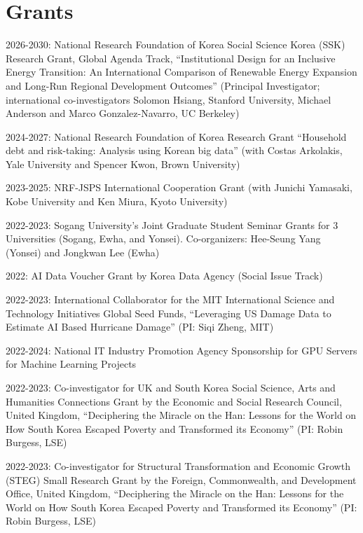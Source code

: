 \documentclass[a4paper,12pt]{article}
\renewenvironment{itemize}{
  \begin{list}{}{
    \setlength{\leftmargin}{1.5em}
  }
}{
  \end{list}
}
\begin{document}
\section*{Grants}

\begin{itemize}
    \item 2026-2030: National Research Foundation of Korea Social Science Korea (SSK) Research Grant, Global Agenda Track, ``Institutional Design for an Inclusive Energy Transition: An International Comparison of Renewable Energy Expansion and Long-Run Regional Development Outcomes'' (Principal Investigator; international co-investigators Solomon Hsiang, Stanford University, Michael Anderson and Marco Gonzalez-Navarro, UC Berkeley)
    \item 2024-2027: National Research Foundation of Korea Research Grant ``Household debt and risk-taking: Analysis using Korean big data'' (with Costas Arkolakis, Yale University and Spencer Kwon, Brown University)
    \item 2023-2025: NRF-JSPS International Cooperation Grant  (with Junichi Yamasaki, Kobe University and Ken Miura, Kyoto University)
    \item 2022-2023: Sogang University's Joint Graduate Student Seminar Grants for 3 Universities (Sogang, Ewha, and Yonsei). Co-organizers: Hee-Seung Yang (Yonsei) and Jongkwan Lee (Ewha)
    \item 2022: AI Data Voucher Grant by Korea Data Agency (Social Issue Track)
    \item 2022-2023: International Collaborator for the MIT International Science and Technology Initiatives Global Seed Funds, ``Leveraging US Damage Data to Estimate AI Based Hurricane Damage'' (PI: Siqi Zheng, MIT)
    \item 2022-2024: National IT Industry Promotion Agency Sponsorship for GPU Servers for Machine Learning Projects
    \item 2022-2023: Co-investigator for UK and South Korea Social Science, Arts and Humanities Connections Grant by the 	Economic and Social Research Council, United Kingdom, ``Deciphering the Miracle on the Han: Lessons for the World on How South Korea Escaped Poverty and Transformed its Economy'' (PI: Robin Burgess, LSE)
    \item 2022-2023: Co-investigator for Structural Transformation and Economic Growth (STEG) Small Research Grant by the Foreign, Commonwealth, and Development Office, United Kingdom, ``Deciphering the Miracle on the Han: Lessons for the World on How South Korea Escaped Poverty and Transformed its Economy'' (PI: Robin Burgess, LSE)

\end{itemize}
\end{document}
